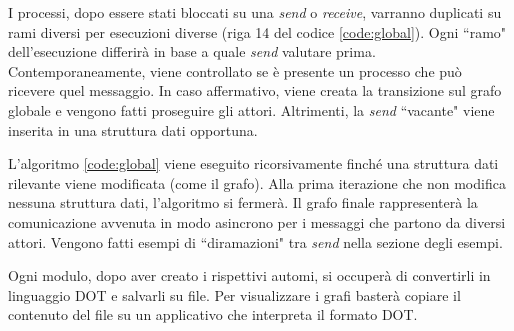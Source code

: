 \bigskip

I processi, dopo essere stati bloccati su una \textit{send} o \textit{receive}, varranno duplicati su rami diversi per esecuzioni diverse (riga 14 del codice \ref{code:global}). Ogni ``ramo" dell'esecuzione differir\`a in base a quale \textit{send} valutare prima. Contemporaneamente, viene controllato se \`e presente un processo che pu\`o ricevere quel messaggio. In caso affermativo, viene creata la transizione sul grafo globale e vengono fatti proseguire gli attori. Altrimenti, la \textit{send} ``vacante" viene inserita in una struttura dati opportuna.

\bigskip

L'algoritmo \ref{code:global} viene eseguito ricorsivamente finch\'e una struttura dati rilevante viene modificata (come il grafo). Alla prima iterazione che non modifica nessuna struttura dati, l'algoritmo si fermer\`a. Il grafo finale rappresenter\`a la comunicazione avvenuta in modo asincrono per i messaggi che partono da diversi attori. Vengono fatti esempi di ``diramazioni" tra \textit{send} nella sezione degli esempi.

\bigskip

Ogni modulo, dopo aver creato i rispettivi automi, si occuper\`a di convertirli in linguaggio DOT e salvarli su file. Per visualizzare i grafi baster\`a copiare il contenuto del file su un applicativo che interpreta il formato DOT.
